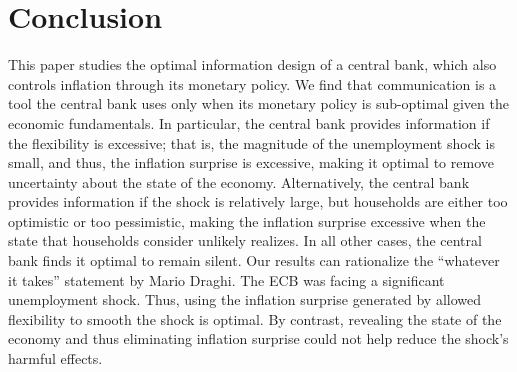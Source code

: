 \documentclass[12pt,a4paper]{article}
\begin{document}
\section{Conclusion}

This paper studies the optimal information design of a central bank, which also controls inflation through its monetary policy.
We find that communication is a tool the central bank uses only when its monetary policy is sub-optimal given the economic fundamentals. In particular, the central bank provides information if the flexibility is excessive; that is, the magnitude of the unemployment shock is small, and thus, the inflation surprise is excessive, making it optimal to remove uncertainty about the state of the economy. Alternatively, the central bank provides information if the shock is relatively large, but households are either too optimistic or too pessimistic, making the inflation surprise excessive when the state that households consider unlikely realizes. In all other cases, the central bank finds it optimal to remain silent. Our results can rationalize the ``whatever it takes'' statement by Mario Draghi. The ECB was facing a significant unemployment shock. Thus, using the inflation surprise generated by allowed flexibility to smooth the shock is optimal. By contrast, revealing the state of the economy and thus eliminating inflation surprise could not help reduce the shock's harmful effects.

\newpage



\appendix
\end{document}
